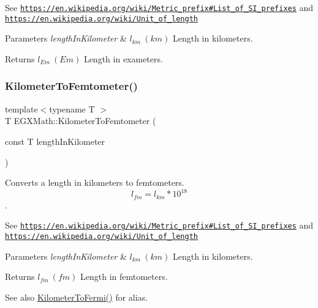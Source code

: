 See \href{https://en.wikipedia.org/wiki/Metric_prefix#List_of_SI_prefixes}{\tt https\+://en.\+wikipedia.\+org/wiki/\+Metric\+\_\+prefix\#\+List\+\_\+of\+\_\+\+S\+I\+\_\+prefixes} and \href{https://en.wikipedia.org/wiki/Unit_of_length}{\tt https\+://en.\+wikipedia.\+org/wiki/\+Unit\+\_\+of\+\_\+length} 
\begin{DoxyParams}{Parameters}
{\em length\+In\+Kilometer} & $ l_{km}\ (km)$ Length in kilometers. \\
\hline
\end{DoxyParams}
\begin{DoxyReturn}{Returns}
$ l_{Em}\ (Em)$ Length in exameters. 
\end{DoxyReturn}
\mbox{\label{group___e_g_x_math-_conversions-_length_conversions-_s_i-_kilometer-_s_i_ga74e9c4726fddf2091c1d687e7c5f4b37}} 
\subsubsection{\texorpdfstring{Kilometer\+To\+Femtometer()}{KilometerToFemtometer()}}
{\footnotesize\ttfamily template$<$typename T $>$ \\
T E\+G\+X\+Math\+::\+Kilometer\+To\+Femtometer (\begin{DoxyParamCaption}\item[{const T}]{length\+In\+Kilometer }\end{DoxyParamCaption})}



Converts a length in kilometers to femtometers. \[ l_{fm}=l_{km} * 10^{18} \]. 

See \href{https://en.wikipedia.org/wiki/Metric_prefix#List_of_SI_prefixes}{\tt https\+://en.\+wikipedia.\+org/wiki/\+Metric\+\_\+prefix\#\+List\+\_\+of\+\_\+\+S\+I\+\_\+prefixes} and \href{https://en.wikipedia.org/wiki/Unit_of_length}{\tt https\+://en.\+wikipedia.\+org/wiki/\+Unit\+\_\+of\+\_\+length} 
\begin{DoxyParams}{Parameters}
{\em length\+In\+Kilometer} & $ l_{km}\ (km)$ Length in kilometers. \\
\hline
\end{DoxyParams}
\begin{DoxyReturn}{Returns}
$ l_{fm}\ (fm)$ Length in femtometers. 
\end{DoxyReturn}
\begin{DoxySeeAlso}{See also}
\mbox{\hyperlink{group___e_g_x_math-_conversions-_length_conversions-_s_i-_kilometer-_non-_s_i_ga9c38d019deb86a60173d5d2b65a1ef57}{Kilometer\+To\+Fermi()}} for alias. 
\end{DoxySeeAlso}
\mbox{\label{group___e_g_x_math-_conversions-_length_conversions-_s_i-_kilometer-_s_i_gafab6496ea68973d69b855d445c8a62a8}} 
